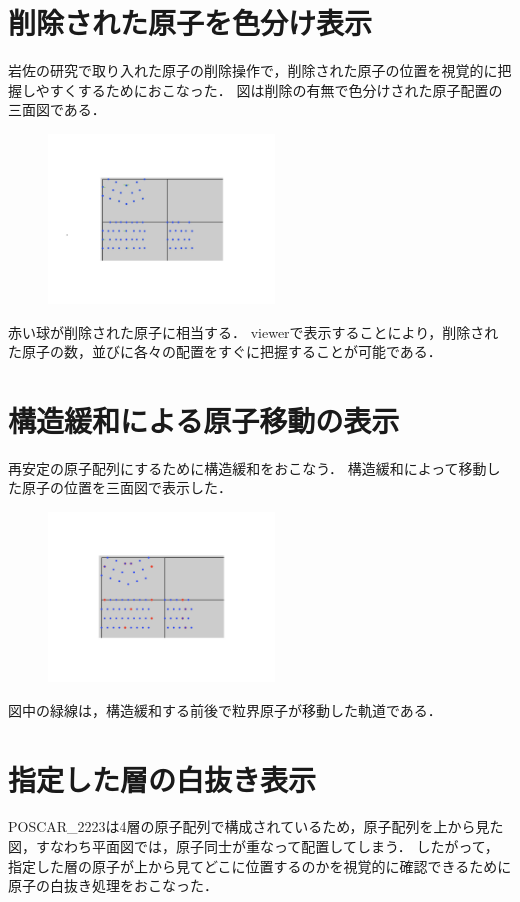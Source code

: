 
\section{削除された原子を色分け表示}
岩佐の研究で取り入れた原子の削除操作で，削除された原子の位置を視覚的に把握しやすくするためにおこなった．
図は削除の有無で色分けされた原子配置の三面図である．

\begin{figure}[htbp]\begin{center}
\includegraphics[width=6cm,bb=0 0 442 500]{../figs/./boundary_narita.010.jpg}
\caption{}
\label{default}\end{center}\end{figure}
赤い球が削除された原子に相当する．
viewerで表示することにより，削除された原子の数，並びに各々の配置をすぐに把握することが可能である．

\section{構造緩和による原子移動の表示}
再安定の原子配列にするために構造緩和をおこなう．
構造緩和によって移動した原子の位置を三面図で表示した．

\begin{figure}[htbp]\begin{center}
\includegraphics[width=6cm,bb=0 0 442 500]{../figs/./boundary_narita.011.jpg}
\caption{}
\label{default}\end{center}\end{figure}
図中の緑線は，構造緩和する前後で粒界原子が移動した軌道である．

\section{指定した層の白抜き表示}
POSCAR\_2223は4層の原子配列で構成されているため，原子配列を上から見た図，すなわち平面図では，原子同士が重なって配置してしまう．
したがって，指定した層の原子が上から見てどこに位置するのかを視覚的に確認できるために原子の白抜き処理をおこなった．

